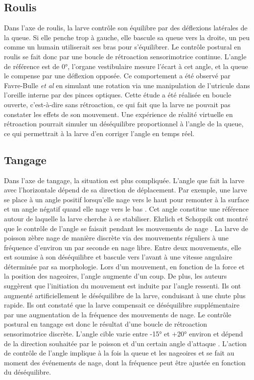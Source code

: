 \subsection{Roulis}
Dans l'axe de roulis, la larve contrôle son équilibre par des déflexions latérales de la queue. Si elle penche trop à gauche, elle bascule sa queue vers la droite, un peu comme un humain utiliserait ses bras pour s'équilibrer. Le contrôle postural en roulis se fait donc par une boucle de rétroaction sensorimotrice continue. L'angle de référence est de 0°, l'organe vestibulaire mesure l'écart à cet angle, et la queue le compense par une déflexion opposée. Ce comportement a été observé par Favre-Bulle \emph{et al} en simulant une rotation via une manipulation de l'utricule dans l'oreille interne par des pinces optiques. Cette étude a été réalisée en boucle ouverte, c'est-à-dire sans rétroaction, ce qui fait que la larve ne pouvait pas constater les effets de son mouvement. Une expérience de réalité virtuelle en rétroaction pourrait simuler un déséquilibre proportionnel à l'angle de la queue, ce qui permettrait à la larve d'en corriger l'angle en temps réel.

\subsection{Tangage}
Dans l'axe de tangage, la situation est plus compliquée. L'angle que fait la larve avec l'horizontale dépend de sa direction de déplacement. Par exemple, une larve se place à un angle positif lorsqu'elle nage vers le haut pour remonter à la surface et un angle négatif quand elle nage vers le bas \cite{ehrlich_primal_2019}. Cet angle constitue une référence autour de laquelle la larve cherche à se stabiliser. Ehrlich et Schoppik ont montré que le contrôle de l'angle se faisait pendant les mouvements de nage \cite{ehrlich_control_2017}. La larve de poisson zèbre nage de manière discrète via des mouvements réguliers à une fréquence d'environ un par seconde en nage libre. Entre deux mouvements, elle est soumise à son déséquilibre et bascule vers l'avant à une vitesse angulaire déterminée par sa morphologie. Lors d'un mouvement, en fonction de la force et la position des nageoires, l'angle augmente d'un coup. De plus, les auteurs suggèrent que l'initiation du mouvement est induite par l'angle ressenti. Ils ont augmenté artificiellement le déséquilibre de la larve, conduisant à une chute plus rapide. Ils ont constaté que la larve compensait ce déséquilibre supplémentaire par une augmentation de la fréquence des mouvements de nage.
Le contrôle postural en tangage est donc le résultat d'une boucle de rétroaction sensorimotrice discrète. L'angle cible varie entre -15° et +20° environ et dépend de la direction souhaitée par le poisson et d'un certain angle d'attaque \cite{ehrlich_primal_2019}. L'action de contrôle de l'angle implique à la fois la queue et les nageoires et se fait au moment des événements de nage, dont la fréquence peut être ajustée en fonction du déséquilibre.

